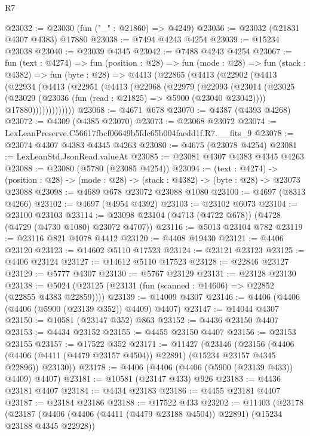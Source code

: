 \begin{lexlean}{R7}
\begin{coremodule}
@23032 := @23030 (fun ("_" : @21860) => @4249)
@23036 := @23032 (@21831 @4307 @4383) @17880
@23038 := @7494 @4243 @4254
@23039 := @15234 @23038
@23040 := @23039 @4345
@23042 := @7488 @4243 @4254
@23067 := fun (text : @4274) =>
  fun (position : @28) =>
  fun (mode : @28) =>
  fun (stack : @4382) =>
  fun (byte : @28) =>
  @4413
    (@22865
      (@4413
        (@22902
          (@4413
            (@22934
              (@4413
                (@22951
                  (@4413
                    (@22968
                      (@22979
                        (@22993
                          (@23014
                            (@23025
                              (@23029 (@23036 (fun (read : @21825) => @5900 (@23040 @23042))))
                              @17880)))))))))))))
@23068 := @4671 @678
@23070 := @4387 (@4393 @4268)
@23072 := @4309 (@4385 @23070)
@23073 := @23068 @23072
@23074 := LexLeanPreserve.C56617fbcf06649b5fdc65b004faedd1f.R7.__fits_9
@23078 := @23074 @4307 @4383 @4345 @4263
@23080 := @4675 (@23078 @4254)
@23081 := LexLeanStd.JsonRead.valueAt
@23085 := @23081 @4307 @4383 @4345 @4263
@23088 := @23080 (@5780 (@23085 @4254))
@23094 := (text : @4274) ->
  (position : @28) -> (mode : @28) -> (stack : @4382) -> (byte : @28) -> @23073 @23088
@23098 := @4689 @678 @23072 @23088 @1080
@23100 := @4697 (@8313 @4266)
@23102 := @4697 (@4954 @4392)
@23103 := @23102 @6073
@23104 := @23100 @23103
@23114 := @23098 @23104 (@4713 (@4722 @678)) (@4728 (@4729 (@4730 @1080) @23072 @4707))
@23116 := @5013 @23104 @782
@23119 := @23116 @821 @1078 @4412
@23120 := @4408 @19430
@23121 := @4406 @23120
@23123 := @14602 @5110 @17523
@23124 := @23121 @23123
@23125 := @4406 @23124
@23127 := @14612 @5110 @17523
@23128 := @22846 @23127
@23129 := @5777 @4307
@23130 := @5767 @23129
@23131 := @23128 @23130
@23138 := @5024 (@23125 (@23131 (fun (scanned : @14606) => @22852 (@22855 @4383 @22859))))
@23139 := @14009 @4307
@23146 := @4406 (@4406 (@4406 (@5900 (@23139 @352)) @4409) @4407)
@23147 := @14044 @4307
@23150 := @10581 (@23147 @352) @863
@23152 := @4436 @23150 @4407
@23153 := @4434 @23152
@23155 := @4455 @23150 @4407
@23156 := @23153 @23155
@23157 := @17522 @352
@23171 := @11427
    (@23146
      (@23156
        (@4406 (@4406 (@4411 (@4479 @23157 @4504)) @22891) (@15234 @23157 @4345 @22896))
        @23130))
@23178 := @4406 (@4406 (@4406 (@5900 (@23139 @433)) @4409) @4407)
@23181 := @10581 (@23147 @433) @926
@23183 := @4436 @23181 @4407
@23184 := @4434 @23183
@23186 := @4455 @23181 @4407
@23187 := @23184 @23186
@23188 := @17522 @433
@23202 := @11403
    (@23178
      (@23187
        (@4406 (@4406 (@4411 (@4479 @23188 @4504)) @22891) (@15234 @23188 @4345 @22928))

\end{coremodule}
\end{lexlean}
